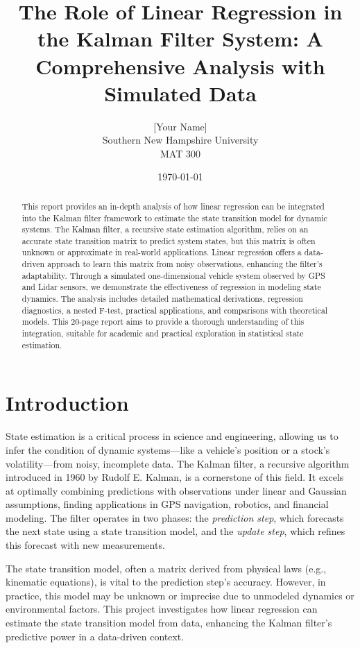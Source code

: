 \documentclass[12pt]{article}
\title{The Role of Linear Regression in the Kalman Filter System: A Comprehensive Analysis with Simulated Data}
\author{[Your Name] \\ Southern New Hampshire University \\ MAT 300}
\date{\today}
\begin{document}
\maketitle

\begin{abstract}
This report provides an in-depth analysis of how linear regression can be integrated into the Kalman filter framework to estimate the state transition model for dynamic systems. The Kalman filter, a recursive state estimation algorithm, relies on an accurate state transition matrix to predict system states, but this matrix is often unknown or approximate in real-world applications. Linear regression offers a data-driven approach to learn this matrix from noisy observations, enhancing the filter’s adaptability. Through a simulated one-dimensional vehicle system observed by GPS and Lidar sensors, we demonstrate the effectiveness of regression in modeling state dynamics. The analysis includes detailed mathematical derivations, regression diagnostics, a nested F-test, practical applications, and comparisons with theoretical models. This 20-page report aims to provide a thorough understanding of this integration, suitable for academic and practical exploration in statistical state estimation.
\end{abstract}
\newpage

\tableofcontents
\clearpage

\section{Introduction}
\label{sec:intro}

State estimation is a critical process in science and engineering, allowing us to infer the condition of dynamic systems—like a vehicle’s position or a stock’s volatility—from noisy, incomplete data. The Kalman filter, a recursive algorithm introduced in 1960 by Rudolf E. Kalman, is a cornerstone of this field. It excels at optimally combining predictions with observations under linear and Gaussian assumptions, finding applications in GPS navigation, robotics, and financial modeling. The filter operates in two phases: the \textit{prediction step}, which forecasts the next state using a state transition model, and the \textit{update step}, which refines this forecast with new measurements.

The state transition model, often a matrix derived from physical laws (e.g., kinematic equations), is vital to the prediction step’s accuracy. However, in practice, this model may be unknown or imprecise due to unmodeled dynamics or environmental factors. This project investigates how linear regression can estimate the state transition model from data, enhancing the Kalman filter’s predictive power in a data-driven context.
\end{document}
